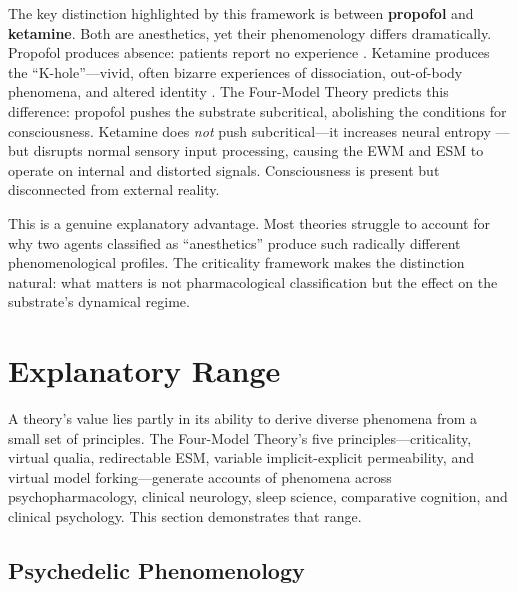 \documentclass[12pt]{article}
\begin{document}
The key distinction highlighted by this framework is between \textbf{propofol} and \textbf{ketamine}. Both are anesthetics, yet their phenomenology differs dramatically. Propofol produces absence: patients report no experience \citep{Alkire2000,Boly2012}. Ketamine produces the ``K-hole''---\hspace{0pt}vivid, often bizarre experiences of dissociation, out-of-body phenomena, and altered identity \citep{Corlett2011}. The Four-Model Theory predicts this difference: propofol pushes the substrate subcritical, abolishing the conditions for consciousness. Ketamine does \emph{not} push subcritical---\hspace{0pt}it increases neural entropy \citep{Schartner2017}---\hspace{0pt}but disrupts normal sensory input processing, causing the EWM and ESM to operate on internal and distorted signals. Consciousness is present but disconnected from external reality.

This is a genuine explanatory advantage. Most theories struggle to account for why two agents classified as ``anesthetics'' produce such radically different phenomenological profiles. The criticality framework makes the distinction natural: what matters is not pharmacological classification but the effect on the substrate's dynamical regime.



\section{Explanatory Range}

A theory's value lies partly in its ability to derive diverse phenomena from a small set of principles. The Four-Model Theory's five principles---\hspace{0pt}criticality, virtual qualia, redirectable ESM, variable implicit-explicit permeability, and virtual model forking---\hspace{0pt}generate accounts of phenomena across psychopharmacology, clinical neurology, sleep science, comparative cognition, and clinical psychology. This section demonstrates that range.


\subsection{Psychedelic Phenomenology}
\end{document}
